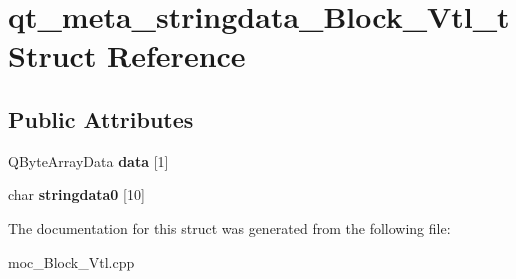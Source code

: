 \hypertarget{structqt__meta__stringdata__Block__Vtl__t}{}\section{qt\+\_\+meta\+\_\+stringdata\+\_\+\+Block\+\_\+\+Vtl\+\_\+t Struct Reference}
\label{structqt__meta__stringdata__Block__Vtl__t}
\subsection*{Public Attributes}
\begin{DoxyCompactItemize}
\item 
Q\+Byte\+Array\+Data {\bfseries data} \mbox{[}1\mbox{]}\hypertarget{structqt__meta__stringdata__Block__Vtl__t_a62b56a8930213f2c3931ce3cf1929261}{}\label{structqt__meta__stringdata__Block__Vtl__t_a62b56a8930213f2c3931ce3cf1929261}

\item 
char {\bfseries stringdata0} \mbox{[}10\mbox{]}\hypertarget{structqt__meta__stringdata__Block__Vtl__t_a60c5abdd7ce66a74654084ba3855c32c}{}\label{structqt__meta__stringdata__Block__Vtl__t_a60c5abdd7ce66a74654084ba3855c32c}

\end{DoxyCompactItemize}


The documentation for this struct was generated from the following file\+:\begin{DoxyCompactItemize}
\item 
moc\+\_\+\+Block\+\_\+\+Vtl.\+cpp\end{DoxyCompactItemize}
